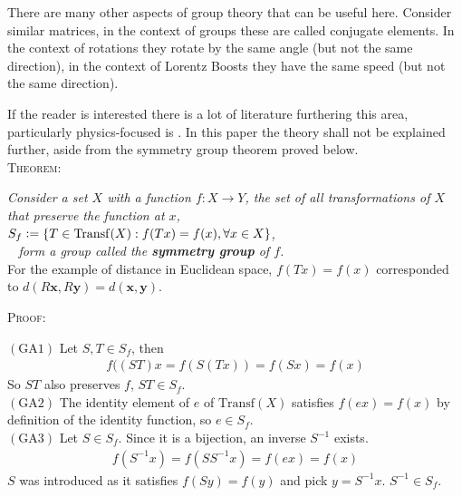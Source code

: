 \documentclass[floatfix,aps,prd,amsmath,amssymb]{revtex4}
\begin{document}
 There are many other aspects of group theory that can be useful here. Consider similar matrices, in the context of groups these are called conjugate elements. In the context of rotations they rotate by the same angle (but not the same direction), in the context of Lorentz Boosts they have the same speed (but not the same direction).
 
 If the reader is interested there is a lot of literature furthering this area, particularly physics-focused is \cite{SCPV3}. In this paper the theory shall not be explained further, aside from the symmetry group theorem proved below. 
\vspace{2mm} \\
\textsc{Theorem:}

{\centering \textit{Consider a set $X$ with a function $f:X\rightarrow Y$, the set of all transformations of $X$ that preserve the function at $x$,\\
$S_f\vcentcolon =\{ T \in \mathrm{Transf}(X) : f(Tx)=f(x), \forall x \in X \}$,\\
$\phantom{a}$ \hspace{48mm} form a group called the \textbf{symmetry group} of $f$.}}
\vspace{2mm} \\

For the example of distance in Euclidean space, $f(Tx)=f(x)$ corresponded to $d(R\mathbf{x},R\mathbf{y}) = d(\mathbf{x},\mathbf{y})$.

\begin{flushleft}\textsc{Proof:} \end{flushleft}

$(\mathrm{GA}1)$ Let $S,T\in S_f$, then
\begin{align*}
f((ST)x=f(S(Tx))= f(Sx) = f(x)
\end{align*}
So $ST$ also preserves $f$, $ST \in S_f$. \\

$(\mathrm{GA}2)$ The identity element of $e$ of $\mathrm{Transf}(X)$ satisfies $f(ex)=f(x)$ by definition of the identity function, so $e \in S_f$.\\

$(\mathrm{GA}3)$  Let $S \in S_f$. Since it is a bijection, an inverse $S^{-1}$ exists. 
\begin{align*}
f(S^{-1}x) = f(SS^{-1}x)= f(ex)= f(x)
\end{align*}
$S$ was introduced as it satisfies $f(Sy)=f(y)$ and pick $y=S^{-1}x$. $S^{-1} \in S_f$.\\
\end{document}
